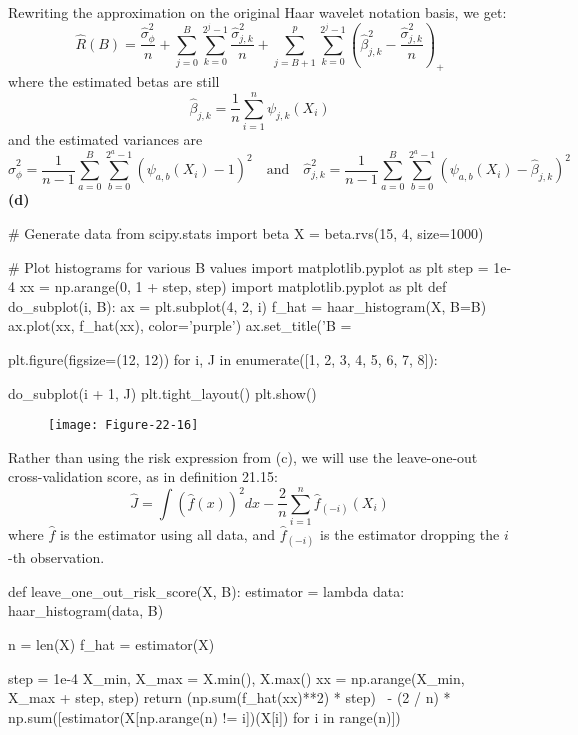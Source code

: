 Rewriting the approximation on the original Haar wavelet notation basis,
we get:
\[
\hat{R}(B) = \frac{\hat{\sigma}_\phi^{2}}{n} 
+ \sum_{j=0}^B \sum_{k=0}^{2^{j} - 1} \frac{\hat{\sigma}_{j, k}^{2}}{n}
+ \sum_{j=B+1}^p \sum_{k=0}^{2^{j} - 1} \left( \hat{\beta}_{j, k}^{2} - \frac{\hat{\sigma}_{j, k}^{2}}{n} \right)_+
\]
where the estimated betas are still
\[
\hat{\beta}_{j, k} = \frac{1}{n} \sum_{i=1}^{n} \psi_{j, k} (X_{i})
\]
and the estimated variances are
\[
\hat{\sigma}_\phi^{2} = \frac{1}{n - 1} \sum_{a=0}^B \sum_{b=0}^{2^{a} - 1} \left( \psi_{a, b}(X_{i}) - 1\right)^{2}
\quad \text{and} \quad
\hat{\sigma}_{j, k}^{2} = \frac{1}{n - 1} \sum_{a=0}^B \sum_{b=0}^{2^{a} - 1} \left( \psi_{a, b}(X_{i}) - \hat{\beta}_{j, k}\right)^{2} 
\]
\textbf{(d)}

\begin{python}
# Generate data
from scipy.stats import beta
X = beta.rvs(15, 4, size=1000)
\end{python}

\begin{python}
# Plot histograms for various B values
import matplotlib.pyplot as plt
step = 1e-4
xx = np.arange(0, 1 + step, step)
import matplotlib.pyplot as plt
def do_subplot(i, B):
    ax = plt.subplot(4, 2, i)
    f_hat = haar_histogram(X, B=B)
    ax.plot(xx, f_hat(xx), color='purple')
    ax.set_title('B = %
    
plt.figure(figsize=(12, 12))
for i, J in enumerate([1, 2, 3, 4, 5, 6, 7, 8]):
    
    do_subplot(i + 1, J)
plt.tight_layout()
plt.show()
\end{python}

\begin{figure}[H]
\centering
\texttt{[image: Figure-22-16]}
\end{figure}

Rather than using the risk expression from (c), we will use the
leave-one-out cross-validation score, as in definition 21.15:
\[
\hat{J} = \int \left( \hat{f}(x) \right)^{2} dx - \frac{2}{n} \sum_{i=1}^{n} \hat{f}_{(-i)} (X_{i})
\]
where \(\hat{f}\) is the estimator using all data, and
\(\hat{f}_{(-i)}\) is the estimator dropping the \(i\)-th observation.

\begin{python}
def leave_one_out_risk_score(X, B):
    estimator = lambda data: haar_histogram(data, B)
    
    n = len(X)
    f_hat = estimator(X)
    
    step = 1e-4
    X_min, X_max = X.min(), X.max()
    xx = np.arange(X_min, X_max + step, step)
    return (np.sum(f_hat(xx)**2) * step) \
        - (2 / n) * np.sum([estimator(X[np.arange(n) != i])(X[i]) for i in range(n)])
\end{python}

